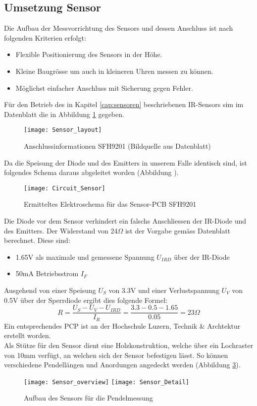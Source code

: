 \subsection{Umsetzung Sensor}
	Die Aufbau der Messvorrichtung des Sensors und dessen Anschluss ist nach folgenden Kriterien erfolgt:
	\begin{itemize}
		\item Flexible Positionierung des Sensors in der Höhe.
		\item Kleine Baugrösse um auch in kleineren Uhren messen zu können.
		\item Möglichst einfacher Anschluss mit Sicherung gegen Fehler.
	\end{itemize}
	Für den Betrieb des in Kapitel \ref{cap:sensoren} beschriebenen IR-Sensors sim im Datenblatt die in Abbildung \ref{fig:info_SFH9201} gegeben.
	\begin{figure}[H]
		\centering
		\texttt{[image: Sensor\_layout]}
		\caption{Anschlussinformationen SFH9201 (Bildquelle aus Datenblatt)}
		\label{fig:info_SFH9201}
	\end{figure}
	Da die Speisung der Diode und des Emitters in unserem Falle identisch sind, ist folgendes Schema daraus abgeleitet worden (Abbildung ).
	\begin{figure}[H]
		\centering
		\texttt{[image: Circuit\_Sensor]}
		\caption{Ermitteltes Elektroschema für das Sensor-PCB SFH9201}
		\label{fig:schema_sensor}
	\end{figure}
	Die Diode vor dem Sensor verhindert ein falschs Anschliessen der IR-Diode und des Emitters. Der Widerstand von 24$\Omega$ ist der Vorgabe gemäss Datenblatt berechnet. Diese sind:
	\begin{itemize}
		\item 1.65V als maximale und gemessene Spannung $U_{IRD}$ über der IR-Diode
		\item 50mA Betriebsstrom $I_F$
	\end{itemize}
	Ausgehend von einer Speisung $U_S$ von 3.3V und einer Verlustspannung $U_V$ von 0.5V über der Sperrdiode ergibt dies folgende Formel:
	\[
		R = \frac{U_S - U_V - U_{IRD}}{I_R} = \frac{3.3 - 0.5 - 1.65}{0.05} = 23\Omega
	\]
	Ein entsprechendes PCP ist an der Hochschule Luzern, Technik \& Archtektur erstellt worden.\\
	Als Stütze für den Sensor dient eine Holzkonstruktion, welche über ein Lochraster von 10mm verfügt, an welchen sich der Sensor befestigen lässt. So können verschiedene Pendellängen und Anordungen angedeckt werden (Abbildung \ref{fig:Sensor_overview}).
	\begin{figure}[H]
		\centering
		\texttt{[image: Sensor\_overview]}
		\texttt{[image: Sensor\_Detail]}
		\caption{Aufbau des Sensors für die Pendelmessung}
		\label{fig:Sensor_overview}
	\end{figure}